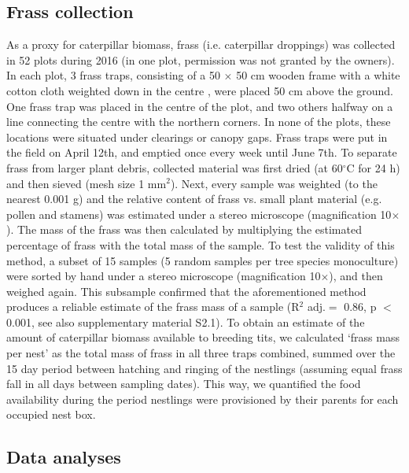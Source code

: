 \documentclass[10pt, twoside]{book} %
\begin{document}
		\subsection*{Frass collection}
		
		As a proxy for caterpillar biomass, frass (i.e. caterpillar droppings) was collected in 52 plots during 2016 (in one plot, permission was not granted by the owners). In each plot, 3 frass traps, consisting of a 50 $\times$ 50 cm wooden frame with a white cotton cloth weighted down in the centre \citep{Zandt1994}, were placed 50 cm above the ground. One frass trap was placed in the centre of the plot, and two others halfway on a line connecting the centre with the northern corners. In none of the plots, these locations were situated under clearings or canopy gaps. Frass traps were put in the field on April 12th, and emptied once every week until June 7th. To separate frass from larger plant debris, collected material was first dried (at 60$^{\circ}$C for 24 h) and then sieved (mesh size 1 mm$^2$). Next, every sample was weighted (to the nearest 0.001 g) and the relative content of frass vs. small plant material (e.g. pollen and stamens) was estimated under a stereo microscope (magnification 10$\times$). The mass of the frass was then calculated by multiplying the estimated percentage of frass with the total mass of the sample. To test the validity of this method, a subset of 15 samples (5 random samples per tree species monoculture) were sorted by hand under a stereo microscope (magnification 10$\times$), and then weighed again. This subsample confirmed that the aforementioned method produces a reliable estimate of the frass mass of a sample (R$^2$ adj.$=$ 0.86, p $<$ 0.001, see also supplementary material S2.1). To obtain an estimate of the amount of caterpillar biomass available to breeding tits, we calculated `frass mass per nest' as the total mass of frass in all three traps combined, summed over the 15 day period between hatching and ringing of the nestlings (assuming equal frass fall in all days between sampling dates). This way, we quantified the food availability during the period nestlings were provisioned by their parents for each occupied nest box.\\
		
		\subsection*{Data analyses}
		
\end{document}
